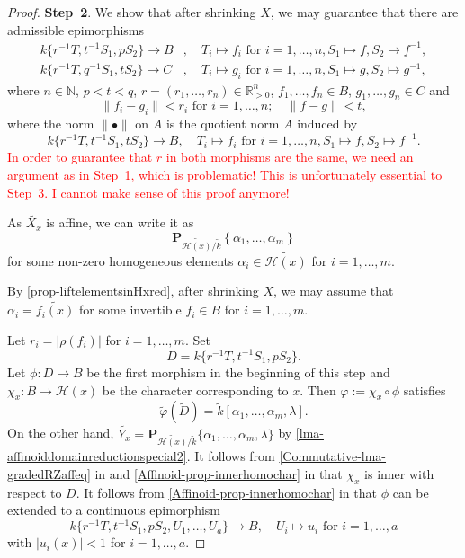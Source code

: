 \begin{proof}
    \textbf{Step~2}. We show that after shrinking $X$, we may guarantee that there are admissible epimorphisms 
    \begin{equation}\label{eq-admepiintermstep}
        \begin{aligned}
        k\{r^{-1}T,t^{-1}S_1,pS_2\}\rightarrow B &,\quad T_i\mapsto f_i \text{ for } i=1,\ldots,n,S_1\mapsto f ,S_2\mapsto f^{-1},\\
        k\{r^{-1}T,q^{-1}S_1,tS_2\}\rightarrow C &,\quad T_i\mapsto g_i \text{ for } i=1,\ldots,n,S_1\mapsto g ,S_2\mapsto g^{-1},
        \end{aligned}
    \end{equation}
    where $n\in \mathbb{N}$, $p<t<q$, $r=(r_1,\ldots,r_n)\in \mathbb{R}^n_{>0}$, $f_1,\ldots,f_n\in B$, $g_1,\ldots,g_n\in C$ and 
    \[
        \|f_i-g_i\|<r_i\text{ for }i=1,\ldots,n;\quad  \|f-g\|< t, 
    \]
    where the norm $\|\bullet\|$ on $A$ is the quotient norm $A$ induced by
    \[
        k\{r^{-1}T,t^{-1}S_1,tS_2\}\rightarrow B,\quad T_i\mapsto f_i\text{ for } i=1,\ldots,n, S_1\mapsto f, S_2\mapsto f^{-1}.
    \]
    \textcolor{red}{In order to guarantee that $r$ in both morphisms are the same, we need an argument as in Step~1, which is problematic! This is unfortunately essential to Step~3. I cannot make sense of this proof anymore!}

    As $\widetilde{X_x}$ is affine, we can write it as 
    \[
        \mathbf{P}_{\widetilde{\mathscr{H}(x)}/\tilde{k}}\left\{\alpha_1,\ldots,\alpha_m\right\}  
    \]
    for some non-zero homogeneous elements $\alpha_i\in \widetilde{\mathscr{H}(x)}$ for $i=1,\ldots,m$. 
    
    By \cref{prop-liftelementsinHxred}, after shrinking $X$, we may assume that $\alpha_i=\widetilde{f_i(x)}$ for some invertible $f_i\in B$ for $i=1,\ldots,m$. 
    
    Let $r_i=|\rho(f_i)|$ for $i=1,\ldots,m$. Set 
    \[
        D=k\{r^{-1}T,t^{-1}S_1,pS_2\}.  
    \]
    Let $\phi:D\rightarrow B$ be the first morphism in the beginning of this step and $\chi_x:B\rightarrow \mathscr{H}(x)$ be the character corresponding to $x$. Then $\varphi:=\chi_x\circ \phi$ satisfies
    \[
        \tilde{\varphi}(\tilde{D})=\tilde{k}[\alpha_1,\ldots,\alpha_m,\lambda].
    \]
    On the other hand, $\widetilde{Y_x}=\mathbf{P}_{\widetilde{\mathscr{H}(x)}/\tilde{k}}\{\alpha_1,\ldots,\alpha_m,\lambda\}$ by \cref{lma-affinoiddomainreductionspecial2}. It follows from \cref{Commutative-lma-gradedRZaffeq} in  and \cref{Affinoid-prop-innerhomochar} in  that $\chi_x$ is inner with respect to $D$. It follows from \cref{Affinoid-prop-innerhomochar} in  that $\phi$ can be extended to a continuous epimorphism
    \[
        k\{r^{-1}T,t^{-1}S_1,pS_2,U_1,\ldots,U_a\}\rightarrow B,\quad U_i\mapsto u_i\text{ for }i=1,\ldots,a  
    \]
    with $|u_i(x)|<1$ for $i=1,\ldots,a$.


\end{proof}
